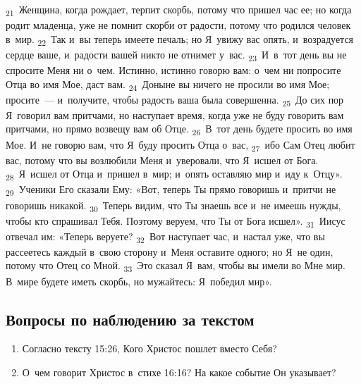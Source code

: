 \documentclass[a4paper,12pt]{article}
\begin{document}
\textsubscript{21}~Женщина, когда рождает, терпит скорбь, потому что пришел час ее; но когда родит младенца, уже не помнит скорби от радости, потому что родился человек в~мир. \textsubscript{22}~Так и~вы теперь имеете печаль; но Я~увижу вас опять, и~возрадуется сердце ваше, и~радости вашей никто не отнимет у~вас. \textsubscript{23}~И~в~тот день вы не спросите Меня ни о~чем. Истинно, истинно говорю вам: о~чем ни попросите Отца во имя Мое, даст вам. \textsubscript{24}~Доныне вы ничего не просили во имя Мое; просите~--- и~получите, чтобы радость ваша была совершенна. \textsubscript{25}~До сих пор Я~говорил вам притчами, но наступает время, когда уже не буду говорить вам притчами, но прямо возвещу вам об Отце. \textsubscript{26}~В~тот день будете просить во имя Мое. И~не говорю вам, что Я~буду просить Отца о~вас, \textsubscript{27}~ибо Сам Отец любит вас, потому что вы возлюбили Меня и~уверовали, что Я~исшел от Бога. \textsubscript{28}~Я~исшел от Отца и~пришел в~мир; и~опять оставляю мир и~иду к~Отцу». \textsubscript{29}~Ученики Его сказали Ему: «Вот, теперь Ты прямо говоришь и~притчи не говоришь никакой. \textsubscript{30}~Теперь видим, что Ты знаешь все и~не имеешь нужды, чтобы кто спрашивал Тебя. Поэтому веруем, что Ты от Бога исшел». \textsubscript{31}~Иисус отвечал им: «Теперь веруете? \textsubscript{32}~Вот наступает час, и~настал уже, что вы рассеетесь каждый в~свою сторону и~Меня оставите одного; но Я~не один, потому что Отец со Мной. \textsubscript{33}~Это сказал Я~вам, чтобы вы имели во Мне мир. В~мире будете иметь скорбь, но мужайтесь: Я~победил мир». 

\subsection*{Вопросы по наблюдению за текстом}
\begin{enumerate}
    \item Согласно тексту 15:26, Кого Христос пошлет вместо Себя? 
    
    \myline
    
    \myline
    \item О~чем говорит Христос в~стихе 16:16? На какое событие Он указывает? 
    
    \myline
    
    \myline
\end{enumerate}
\end{document}
